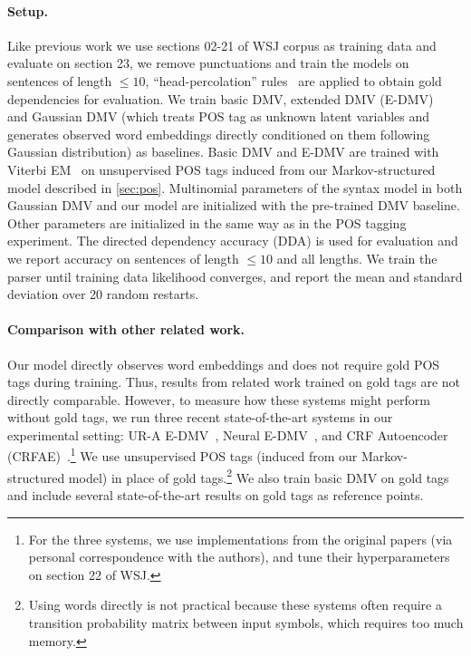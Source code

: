 \documentclass[11pt,a4paper]{article}
\begin{document}
\paragraph{Setup.}
Like previous work we use sections 02-21 of WSJ corpus as training data and evaluate on section 23,  we remove punctuations and train the models on sentences of length $\leqslant 10$, ``head-percolation'' rules~\citep{collins1999head} are applied to obtain gold dependencies for evaluation. We train basic DMV, extended DMV (E-DMV)~\citep{headden2009improving} and Gaussian DMV (which treats POS tag as unknown latent variables and generates observed word embeddings directly conditioned on them following Gaussian distribution) as baselines. Basic DMV and E-DMV are trained with Viterbi EM~\citep{spitkovsky2010viterbi} on unsupervised POS tags induced from our Markov-structured model described in \cref{sec:pos}. Multinomial parameters of the syntax model in both Gaussian DMV and our model are initialized with the pre-trained DMV baseline. Other parameters are initialized in the same way as in the POS tagging experiment. The directed dependency accuracy (DDA) is used for evaluation and we report accuracy on sentences of length $\leqslant 10$ and all lengths. We train the parser until training data likelihood converges, and report the mean and standard deviation over 20 random restarts. 

\paragraph{Comparison with other related work.}
Our model directly observes word embeddings and does not require gold POS tags during training. Thus, results from related work trained on gold tags are not directly comparable. However, to measure how these systems might perform without gold tags, we run three recent state-of-the-art systems in our experimental setting: UR-A E-DMV~\citep{tu2012unambiguity}, Neural E-DMV~\citep{jiang2016unsupervised}, and CRF Autoencoder (CRFAE)~\citep{cai2017crf}.\footnote{For the three systems, we use implementations from the original papers (via personal correspondence with the authors), and tune their hyperparameters on section 22 of WSJ.} We use unsupervised POS tags (induced from our Markov-structured model) in place of gold tags.\footnote{Using words directly is not practical because these systems often require a transition probability matrix between input symbols, which requires too much memory.} We also train basic DMV on gold tags and include several state-of-the-art results on gold tags as reference points.
\end{document}
